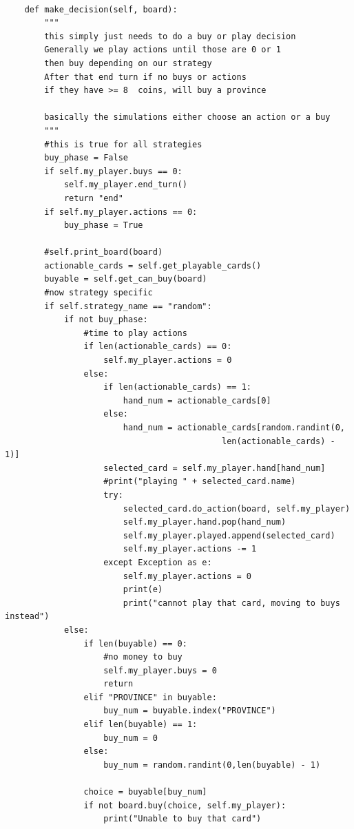 \documentclass[11pt, oneside]{article}   	%
\begin{document}
\begin{verbatim}

    def make_decision(self, board):
        """
        this simply just needs to do a buy or play decision
        Generally we play actions until those are 0 or 1
        then buy depending on our strategy
        After that end turn if no buys or actions
        if they have >= 8  coins, will buy a province

        basically the simulations either choose an action or a buy
        """
        #this is true for all strategies
        buy_phase = False
        if self.my_player.buys == 0:
            self.my_player.end_turn()
            return "end"
        if self.my_player.actions == 0:
            buy_phase = True

        #self.print_board(board)
        actionable_cards = self.get_playable_cards()
        buyable = self.get_can_buy(board)
        #now strategy specific
        if self.strategy_name == "random":
            if not buy_phase:
                #time to play actions
                if len(actionable_cards) == 0:
                    self.my_player.actions = 0
                else:
                    if len(actionable_cards) == 1:
                        hand_num = actionable_cards[0]
                    else:
                        hand_num = actionable_cards[random.randint(0,
                        					len(actionable_cards) - 1)]
                    selected_card = self.my_player.hand[hand_num]
                    #print("playing " + selected_card.name)
                    try:
                        selected_card.do_action(board, self.my_player)
                        self.my_player.hand.pop(hand_num) 
                        self.my_player.played.append(selected_card)
                        self.my_player.actions -= 1
                    except Exception as e:
                        self.my_player.actions = 0
                        print(e)
                        print("cannot play that card, moving to buys instead")
            else:
                if len(buyable) == 0:
                    #no money to buy
                    self.my_player.buys = 0
                    return
                elif "PROVINCE" in buyable:
                    buy_num = buyable.index("PROVINCE")
                elif len(buyable) == 1:
                    buy_num = 0
                else:
                    buy_num = random.randint(0,len(buyable) - 1)

                choice = buyable[buy_num]
                if not board.buy(choice, self.my_player):
                    print("Unable to buy that card")
\end{verbatim}
\end{document}
